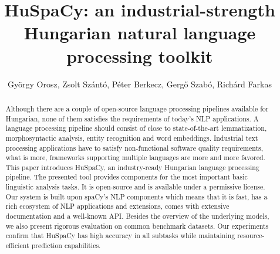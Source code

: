 \documentclass{llncs}
\newcommand{\huspacy}{HuSpaCy}
\begin{document}
\pagestyle{myheadings}
\def\leftmark{{\rm XVIII. Magyar Sz\'am\'\i t\'og\'epes Nyelv\'eszeti Konferencia}}
\def\rightmark{{\rm Szeged, 2022. január 27-28.}}


\title{\huspacy: an industrial-strength Hungarian natural language processing toolkit}

\author{
György Orosz,
Zsolt Szántó, \break
Péter Berkecz,
Gergő Szabó,
Richárd Farkas\\
\break
{}\break
}

\maketitle

\begin{abstract}
Although there are a couple of open-source language processing pipelines available for Hungarian, none of them satisfies the requirements of today’s NLP applications. A language processing pipeline should consist of close to state-of-the-art lemmatization, morphosyntactic analysis, entity recognition and word embeddings. 
Industrial text processing applications have to satisfy non-functional software quality requirements, what is more, frameworks supporting multiple languages are more and more favored.
This paper introduces \huspacy, an industry-ready Hungarian language processing pipeline. The presented tool provides components for the most important basic linguistic analysis tasks. It is open-source and is available under a permissive license. Our system is built upon spaCy’s NLP components which means that it is fast, has a rich ecosystem of NLP applications and extensions, comes with extensive documentation and a well-known API. Besides the overview of the underlying models, we also present rigorous evaluation on common benchmark datasets. Our experiments confirm that HuSpaCy has high accuracy in all subtasks while maintaining resource-efficient prediction capabilities. 
\end{abstract}
\end{document}
